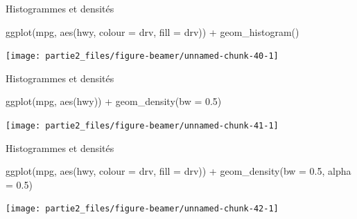 \documentclass[12pt,ignorenonframetext,]{beamer}
\newenvironment{Shaded}{}{}
\newcommand{\DataTypeTok}[1]{#1}
\newcommand{\FloatTok}[1]{#1}
\newcommand{\KeywordTok}[1]{\textcolor[rgb]{0.00,0.00,1.00}{#1}}
\newcommand{\NormalTok}[1]{#1}
\newcommand{\OperatorTok}[1]{#1}
\newcommand{\StringTok}[1]{\textcolor[rgb]{0.00,0.50,0.50}{#1}}
\renewenvironment{Shaded}{\begin{snugshade}}{\end{snugshade}}
\begin{document}
\begin{frame}[fragile]{Histogrammes et densités}
\protect\hypertarget{histogrammes-et-densites-4}{}

\footnotesize \center

\begin{Shaded}
\begin{Highlighting}[]
\KeywordTok{ggplot}\NormalTok{(mpg, }\KeywordTok{aes}\NormalTok{(hwy, }\DataTypeTok{colour =}\NormalTok{ drv, }\DataTypeTok{fill =}\NormalTok{ drv)) }\OperatorTok{+}\StringTok{ }
\StringTok{  }\KeywordTok{geom_histogram}\NormalTok{()}
\end{Highlighting}
\end{Shaded}

\texttt{[image: partie2\_files/figure-beamer/unnamed-chunk-40-1]}

\end{frame}

\begin{frame}[fragile]{Histogrammes et densités}
\protect\hypertarget{histogrammes-et-densites-5}{}

\footnotesize \center

\begin{Shaded}
\begin{Highlighting}[]
\KeywordTok{ggplot}\NormalTok{(mpg, }\KeywordTok{aes}\NormalTok{(hwy)) }\OperatorTok{+}\StringTok{ }\KeywordTok{geom_density}\NormalTok{(}\DataTypeTok{bw =} \FloatTok{0.5}\NormalTok{)}
\end{Highlighting}
\end{Shaded}

\texttt{[image: partie2\_files/figure-beamer/unnamed-chunk-41-1]}

\end{frame}

\begin{frame}[fragile]{Histogrammes et densités}
\protect\hypertarget{histogrammes-et-densites-6}{}

\footnotesize \center

\begin{Shaded}
\begin{Highlighting}[]
\KeywordTok{ggplot}\NormalTok{(mpg, }\KeywordTok{aes}\NormalTok{(hwy, }\DataTypeTok{colour =}\NormalTok{ drv, }\DataTypeTok{fill =}\NormalTok{ drv)) }\OperatorTok{+}\StringTok{ }
\StringTok{  }\KeywordTok{geom_density}\NormalTok{(}\DataTypeTok{bw =} \FloatTok{0.5}\NormalTok{, }\DataTypeTok{alpha =} \FloatTok{0.5}\NormalTok{)}
\end{Highlighting}
\end{Shaded}

\texttt{[image: partie2\_files/figure-beamer/unnamed-chunk-42-1]}

\end{frame}
\end{document}
